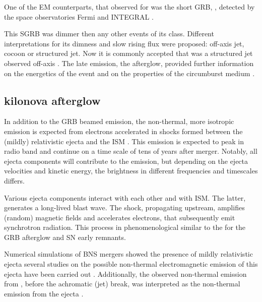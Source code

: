 One of the \ac{EM} counterparts, that observed for \GW{} was the short \ac{GRB}, \GRB{} \citep{Savchenko:2017ffs,Alexander:2017aly,Troja:2017nqp,Monitor:2017mdv,Nynka:2018vup,Hajela:2019mjy}, detected by the space observatories Fermi \citep{TheFermi-LAT:2015kwa} and INTEGRAL \citep{Winkler:2011}.

This \ac{SGRB} was dimmer then any other events of its class. 
Different interpretations for its dimness and slow rising flux were proposed: off-axis jet, cocoon or structured jet. 
Now it is commonly accepted that \GRB{} was a structured jet observed off-axis 
\citep[\eg][]{Fong:2017ekk,Troja:2017nqp,Margutti:2018xqd,Lamb:2017ych,Lamb:2018ohw,Ryan:2019fhz}.
The \GRB{} late emission, the afterglow, provided further information on 
the energetics of the event and on the properties of the circumburst medium \citep[\eg][]{Hajela:2019mjy}.


\subsection{kilonova afterglow}

In addition to the \ac{GRB} beamed emission, the non-thermal, more isotropic emission is expected from electrons accelerated in shocks formed between the (mildly) relativistic ejecta and the \ac{ISM} \citep{Nakar:2011cw}. This emission is expected to peak in radio band and continue on a time scale of tens of years after merger. Notably, all ejecta components will contribute to the emission, but  depending on the ejecta velocities and kinetic energy, the brightness in different frequencies and timescales differs. 

Various ejecta components interact with each other and with \ac{ISM}. The latter, generates a long-lived blast wave. The shock, propagating upstream, amplifies (random) magnetic fields and accelerates electrons, that subsequently emit synchrotron radiation. This process in phenomenological similar to the for the \ac{GRB} afterglow and \ac{SN} early remnants. 

Numerical simulations of \ac{BNS} mergers showed the presence of mildly relativistic ejecta several 
studies on the possible non-thermal electromagnetic emission of this ejecta have been carried out 
\citet[\eg][]{Piran:2012wd,Hotokezaka:2015eja,Radice:2018pdn}. Additionally, the observed non-thermal emission from \GW{}, before the achromatic (jet) break, was interpreted as the non-thermal emission 
from the ejecta \citep{Mooley:2017enz}.

